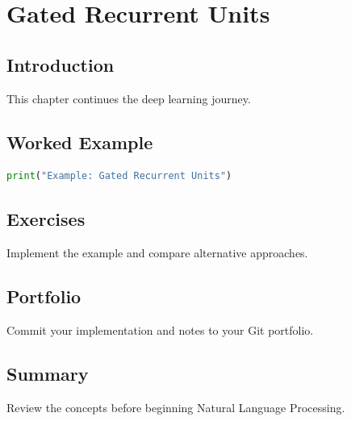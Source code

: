 \chapter{Gated Recurrent Units}
\label{chap:vol7-12}



\section{Introduction}
This chapter continues the deep learning journey.

\section{Worked Example}
\begin{lstlisting}[language=Python]
print("Example: Gated Recurrent Units")
\end{lstlisting}

\section{Exercises}
\begin{exercise}
Implement the example and compare alternative approaches.
\end{exercise}

\section{Portfolio}
Commit your implementation and notes to your Git portfolio.

\section{Summary}
Review the concepts before beginning Natural Language Processing.
